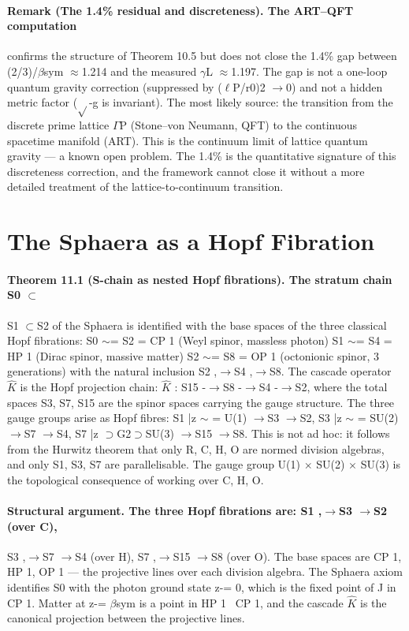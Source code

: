 \documentclass[12pt,a4paper]{article}
\begin{document}
\paragraph*{Remark (The 1.4\% residual and discreteness). The ART--QFT computation}
confirms the structure of Theorem 10.5 but does not close the 1.4\% gap between (2/3)/$\beta$sym $\approx$1.214 and the measured $\gamma$L $\approx$1.197. The gap is not a one-loop
quantum gravity correction (suppressed by ($\ell$P/r0)2 $\to$0) and not a hidden metric factor ($\sqrt{}$-g is invariant). The most likely source: the transition from the discrete prime lattice $\Gamma$P (Stone--von Neumann, QFT) to the continuous spacetime manifold (ART). This is the continuum limit of lattice quantum gravity --- a known open problem. The 1.4\% is the quantitative signature of this discreteness correction, and the framework cannot close it without a more detailed treatment of the lattice-to-continuum transition.

\section{The Sphaera as a Hopf Fibration}
\paragraph*{Theorem 11.1 (S-chain as nested Hopf fibrations). The stratum chain S0 $\subset$}
S1 $\subset$S2 of the Sphaera is identified with the base spaces of the three classical Hopf fibrations: S0 $\sim$= S2 = CP 1 (Weyl spinor, massless photon) S1 $\sim$= S4 = HP 1 (Dirac spinor, massive matter) S2 $\sim$= S8 = OP 1 (octonionic spinor, 3 generations) with the natural inclusion S2 ,$\to$S4 ,$\to$S8. The cascade operator $\hat K$ is the Hopf projection chain: $\hat K$ : S15 -$\to$S8 -$\to$S4 -$\to$S2, where the total spaces S3, S7, S15 are the spinor spaces carrying the gauge structure. The three gauge groups arise as Hopf fibres: S1 |{z} $\sim$ = U(1) $\to$S3 $\to$S2, S3 |{z} $\sim$ = SU(2) $\to$S7 $\to$S4, S7 |{z} $\supset$G2$\supset$SU(3) $\to$S15 $\to$S8. This is not ad hoc: it follows from the Hurwitz theorem that only R, C, H, O are normed division algebras, and only S1, S3, S7 are parallelisable. The gauge group U(1) $\times$ SU(2) $\times$ SU(3) is the topological consequence of working over C, H, O.
\paragraph*{Structural argument. The three Hopf fibrations are: S1 ,$\to$S3 $\to$S2 (over C),}
S3 ,$\to$S7 $\to$S4 (over H), S7 ,$\to$S15 $\to$S8 (over O). The base spaces are CP 1, HP 1, OP 1 --- the projective lines over each division algebra. The Sphaera axiom identifies S0 with the photon ground state z-= 0, which is the fixed point of J in CP 1. Matter at z-= $\beta$sym is a point in HP 1 \ CP 1, and the cascade $\hat K$ is the canonical projection between the projective lines.
\end{document}
